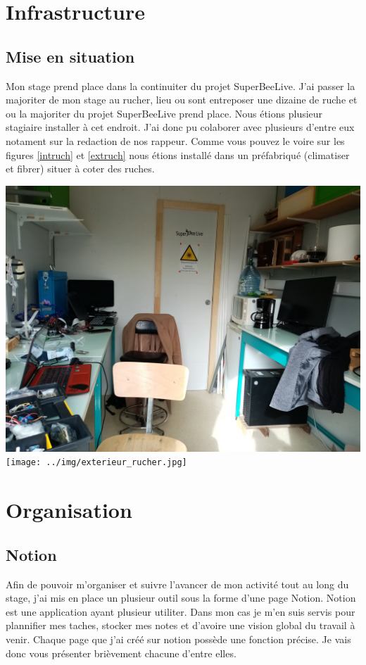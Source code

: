 \documentclass[11pt,french,a4paper]{article}
\begin{document}
\newpage
\section{Infrastructure}
\subsection{Mise en situation}
Mon stage prend place dans la continuiter du projet SuperBeeLive. J'ai passer la majoriter de mon stage au rucher, lieu ou sont entreposer une dizaine de ruche et ou la majoriter du projet SuperBeeLive prend place.
Nous étions plusieur stagiaire installer à cet endroit. J'ai donc pu colaborer avec plusieurs d'entre eux notament sur la redaction de nos rappeur. Comme vous pouvez le voire sur les figures \ref{intruch} et \ref{extruch}  nous étions installé dans un préfabriqué (climatiser et fibrer) situer à coter des ruches.

\begin{center}	
\includegraphics[scale=0.075]{../img/interieur_rucher.jpg}
\label{intruch}
\texttt{[image: ../img/exterieur\_rucher.jpg]}
\label{extruch}
\end{center}


\newpage
\section{Organisation}
\subsection{Notion}
Afin de pouvoir m'organiser et suivre l'avancer de mon activité tout au long du stage, j'ai mis en place un plusieur outil sous la forme d'une page Notion.
Notion est une application ayant plusieur utiliter. Dans mon cas je m'en suis servis pour plannifier mes taches, stocker mes notes et d'avoire une vision global du travail à venir. 
Chaque page que j'ai créé sur notion possède une fonction précise. Je vais donc vous présenter brièvement chacune d'entre elles.
\end{document}
